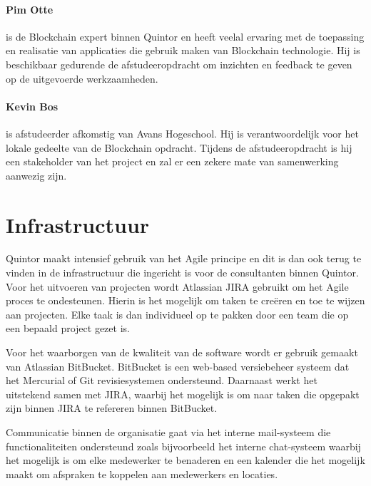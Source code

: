 \paragraph{Pim Otte} \label{expert} is de Blockchain expert binnen Quintor en heeft veelal ervaring met de toepassing en realisatie van applicaties die gebruik maken van Blockchain technologie. Hij is beschikbaar gedurende de afstudeeropdracht om inzichten en feedback te geven op de uitgevoerde werkzaamheden.

\paragraph{Kevin Bos} is afstudeerder afkomstig van Avans Hogeschool. Hij is verantwoordelijk voor het lokale gedeelte van de Blockchain opdracht. Tijdens de afstudeeropdracht is hij een stakeholder van het project en zal er een zekere mate van samenwerking aanwezig zijn.

\section{Infrastructuur}

Quintor maakt intensief gebruik van het Agile principe en dit is dan ook terug te vinden in de infrastructuur die ingericht is voor de consultanten binnen Quintor. Voor het uitvoeren van projecten wordt Atlassian JIRA gebruikt om het Agile proces te ondesteunen. Hierin is het mogelijk om taken te creëren en toe te wijzen aan projecten. Elke taak is dan individueel op te pakken door een team die op een bepaald project gezet is. 

Voor het waarborgen van de kwaliteit van de software wordt er gebruik gemaakt van Atlassian BitBucket. BitBucket is een web-based versiebeheer systeem dat het Mercurial of Git revisiesystemen ondersteund. Daarnaast werkt het uitstekend samen met JIRA, waarbij het mogelijk is om naar taken die opgepakt zijn binnen JIRA te refereren binnen BitBucket.

Communicatie binnen de organisatie gaat via het interne mail-systeem die functionaliteiten ondersteund zoals bijvoorbeeld het interne chat-systeem waarbij het mogelijk is om elke medewerker te benaderen en een kalender die het mogelijk maakt om afspraken te koppelen aan medewerkers en locaties.